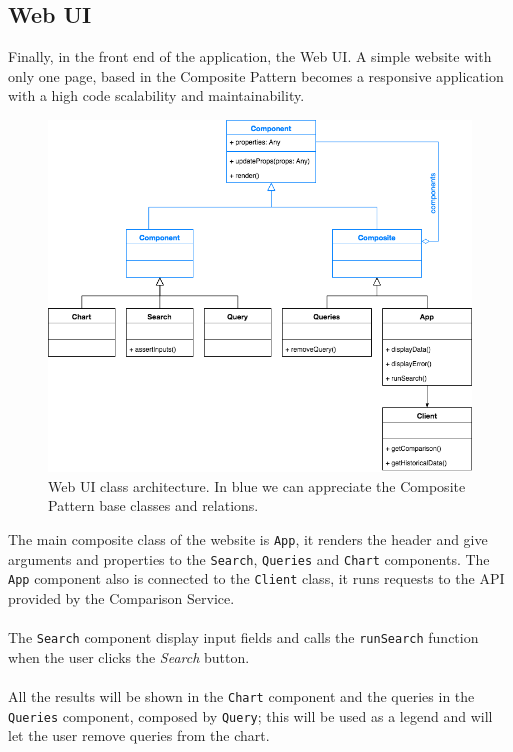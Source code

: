 \newpage


\subsection{Web UI} \label{web-ui}

Finally, in the front end of the application, the Web UI. A simple website with only one page, based in the Composite Pattern becomes a responsive application with a high code scalability and maintainability.

\begin{figure}[H]
\centering
\includegraphics[scale=0.5]{diagrams/web-ui-architecture.png}
\caption{Web UI class architecture. In blue we can appreciate the Composite Pattern base classes and relations.}
\end{figure}

The main composite class of the website is \texttt{App}, it renders the header and give arguments and properties to the \texttt{Search}, \texttt{Queries} and \texttt{Chart} components. The \texttt{App} component also is connected to the \texttt{Client} class, it runs requests to the API provided by the Comparison Service.
\\\\
The \texttt{Search} component display input fields and calls the \texttt{runSearch} function when the user clicks the \textit{Search} button.
\\\\
All the results will be shown in the \texttt{Chart} component and the queries in the \texttt{Queries} component, composed by \texttt{Query}; this will be used as a legend and will let the user remove queries from the chart.

